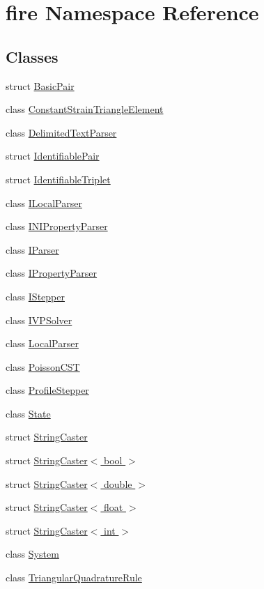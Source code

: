 \hypertarget{a00189}{}\section{fire Namespace Reference}
\label{a00189}
\subsection*{Classes}
\begin{DoxyCompactItemize}
\item 
struct \hyperlink{a00768}{Basic\+Pair}
\item 
class \hyperlink{a00764}{Constant\+Strain\+Triangle\+Element}
\item 
class \hyperlink{a00796}{Delimited\+Text\+Parser}
\item 
struct \hyperlink{a00772}{Identifiable\+Pair}
\item 
struct \hyperlink{a00776}{Identifiable\+Triplet}
\item 
class \hyperlink{a00800}{I\+Local\+Parser}
\item 
class \hyperlink{a00804}{I\+N\+I\+Property\+Parser}
\item 
class \hyperlink{a00808}{I\+Parser}
\item 
class \hyperlink{a00812}{I\+Property\+Parser}
\item 
class \hyperlink{a00784}{I\+Stepper}
\item 
class \hyperlink{a00856}{I\+V\+P\+Solver}
\item 
class \hyperlink{a00816}{Local\+Parser}
\item 
class \hyperlink{a00780}{Poisson\+C\+ST}
\item 
class \hyperlink{a00788}{Profile\+Stepper}
\item 
class \hyperlink{a00860}{State}
\item 
struct \hyperlink{a00820}{String\+Caster}
\item 
struct \hyperlink{a00836}{String\+Caster$<$ bool $>$}
\item 
struct \hyperlink{a00824}{String\+Caster$<$ double $>$}
\item 
struct \hyperlink{a00828}{String\+Caster$<$ float $>$}
\item 
struct \hyperlink{a00832}{String\+Caster$<$ int $>$}
\item 
class \hyperlink{a00792}{System}
\item 
class \hyperlink{a00852}{Triangular\+Quadrature\+Rule}
\end{DoxyCompactItemize}
